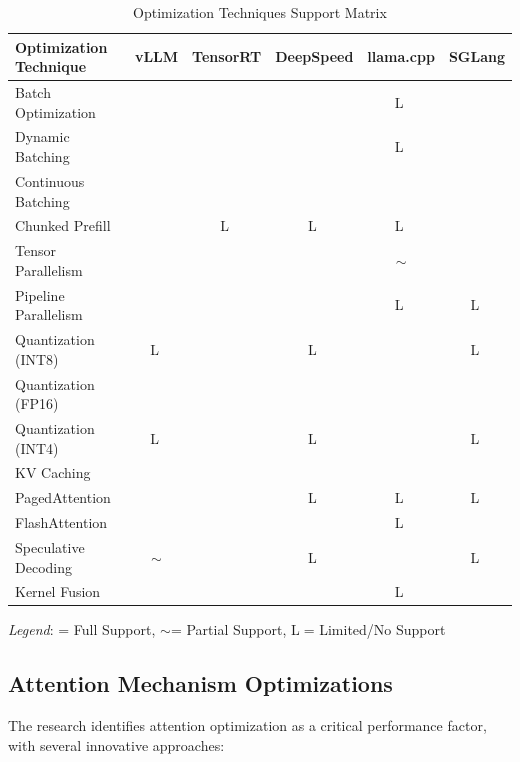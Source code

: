 \documentclass[12pt,a4paper]{article}
\newcommand{\cmark}{\ding{51}}
\newcommand{\pmark}{$\sim$}
\newcommand{\lmark}{\textcircled{\scriptsize L}}
\begin{document}
\begin{table}[htbp]
\centering
\caption{Optimization Techniques Support Matrix}
\label{tab:optimization_matrix}
\begin{tabular}{@{}p{4cm}ccccc@{}}
\toprule
\textbf{Optimization Technique} & \textbf{vLLM} & \textbf{TensorRT} & \textbf{DeepSpeed} & \textbf{llama.cpp} & \textbf{SGLang} \\
\midrule
Batch Optimization      & \cmark & \cmark & \cmark & \lmark & \cmark \\
Dynamic Batching        & \cmark & \cmark & \cmark & \lmark & \cmark \\
Continuous Batching     & \cmark & \cmark & \cmark & \cmark & \cmark \\
Chunked Prefill         & \cmark & \lmark & \lmark & \lmark & \cmark \\
Tensor Parallelism      & \cmark & \cmark & \cmark & \pmark & \cmark \\
Pipeline Parallelism    & \cmark & \cmark & \cmark & \lmark & \lmark \\
Quantization (INT8)     & \lmark & \cmark & \lmark & \cmark & \lmark \\
Quantization (FP16)     & \cmark & \cmark & \cmark & \cmark & \cmark \\
Quantization (INT4)     & \lmark & \cmark & \lmark & \cmark & \lmark \\
KV Caching              & \cmark & \cmark & \cmark & \cmark & \cmark \\
PagedAttention          & \cmark & \cmark & \lmark & \lmark & \lmark \\
FlashAttention          & \cmark & \cmark & \cmark & \lmark & \cmark \\
Speculative Decoding    & \pmark & \cmark & \lmark & \cmark & \lmark \\
Kernel Fusion           & \cmark & \cmark & \cmark & \lmark & \cmark \\
\bottomrule
\end{tabular}
\end{table}

\textit{Legend}: \cmark = Full Support, \pmark = Partial Support, \lmark = Limited/No Support

\subsection{Attention Mechanism Optimizations}

The research identifies attention optimization as a critical performance factor, with several innovative approaches:
\end{document}
